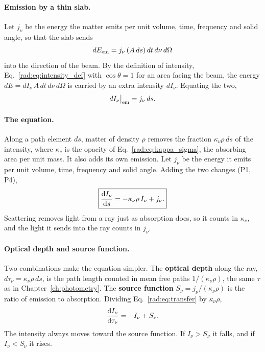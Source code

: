 \paragraph{Emission by a thin slab.} Let $j_\nu$ be the energy the matter emits per unit volume, time, frequency and solid angle, so that the slab sends
\[
dE_{\rm em}=j_\nu\,(A\,ds)\,dt\,d\nu\,d\Omega
\]
into the direction of the beam. By the definition of intensity, Eq.~\eqref{rad:eq:intensity_def} with $\cos\theta=1$ for an area facing the beam, the energy $dE=dI_\nu\,A\,dt\,d\nu\,d\Omega$ is carried by an extra intensity $dI_\nu$. Equating the two,
\[
dI_\nu\big|_{\rm em}=j_\nu\,ds .
\]

\paragraph{The equation.} Along a path element $ds$, matter of density $\rho$ removes the fraction $\kappa_\nu\rho\,ds$ of the intensity, where $\kappa_\nu$ is the opacity of Eq.~\eqref{rad:eq:kappa_sigma}, the absorbing area per unit mass. It also adds its own emission. Let $j_\nu$ be the energy it emits per unit volume, time, frequency and solid angle. Adding the two changes (P1, P4),
\begin{equation}
	\boxed{\dv{I_\nu}{s}=-\kappa_\nu\rho\,I_\nu+j_\nu .}
	\label{rad:eq:transfer}
\end{equation}
Scattering removes light from a ray just as absorption does, so it counts in $\kappa_\nu$, and the light it sends into the ray counts in $j_\nu$.

\paragraph{Optical depth and source function.} Two combinations make the equation simpler. The \textbf{optical depth} along the ray, $d\tau_\nu=\kappa_\nu\rho\,ds$, is the path length counted in mean free paths $1/(\kappa_\nu\rho)$, the same $\tau$ as in Chapter~\ref{ch:photometry}. The \textbf{source function} $S_\nu=j_\nu/(\kappa_\nu\rho)$ is the ratio of emission to absorption. Dividing Eq.~\eqref{rad:eq:transfer} by $\kappa_\nu\rho$,
\begin{equation}
	\dv{I_\nu}{\tau_\nu}=-I_\nu+S_\nu .
	\label{rad:eq:transfer_tau}
\end{equation}
The intensity always moves toward the source function. If $I_\nu>S_\nu$ it falls, and if $I_\nu<S_\nu$ it rises.

